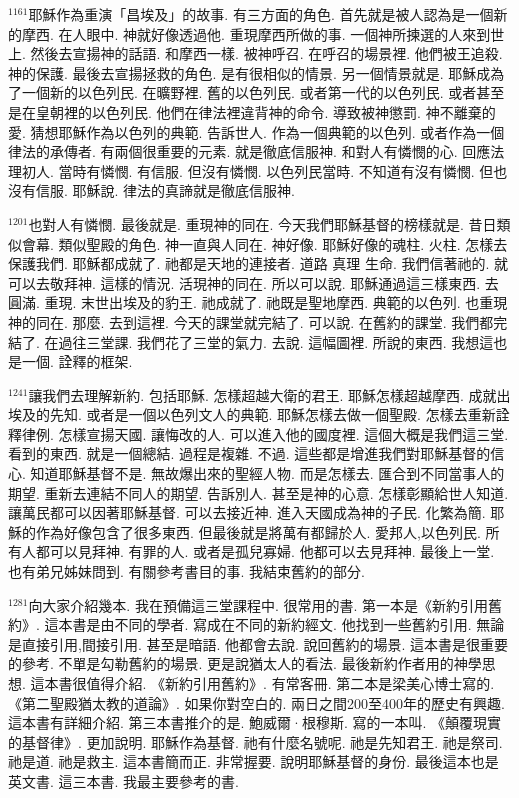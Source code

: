 \documentclass{book}
\begin{document}
$^{1161}$耶穌作為重演「昌埃及」的故事.
有三方面的角色.
首先就是被人認為是一個新的摩西.
在人眼中.
神就好像透過他.
重現摩西所做的事.
一個神所揀選的人來到世上.
然後去宣揚神的話語.
和摩西一樣.
被神呼召.
在呼召的場景裡.
他們被王追殺.
神的保護.
最後去宣揚拯救的角色.
是有很相似的情景.
另一個情景就是.
耶穌成為了一個新的以色列民.
在曠野裡.
舊的以色列民.
或者第一代的以色列民.
或者甚至是在皇朝裡的以色列民.
他們在律法裡違背神的命令.
導致被神懲罰.
神不離棄的愛.
猜想耶穌作為以色列的典範.
告訴世人.
作為一個典範的以色列.
或者作為一個律法的承傳者.
有兩個很重要的元素.
就是徹底信服神.
和對人有憐憫的心.
回應法理初人.
當時有憐憫.
有信服.
但沒有憐憫.
以色列民當時.
不知道有沒有憐憫.
但也沒有信服.
耶穌說.
律法的真諦就是徹底信服神.

$^{1201}$也對人有憐憫.
最後就是.
重現神的同在.
今天我們耶穌基督的榜樣就是.
昔日類似會幕.
類似聖殿的角色.
神一直與人同在.
神好像.
耶穌好像的魂柱.
火柱.
怎樣去保護我們.
耶穌都成就了.
祂都是天地的連接者.
道路 真理 生命.
我們信著祂的.
就可以去敬拜神.
這樣的情況.
活現神的同在.
所以可以說.
耶穌通過這三樣東西.
去圓滿.
重現.
末世出埃及的豹王.
祂成就了.
祂既是聖地摩西.
典範的以色列.
也重現神的同在.
那麼.
去到這裡.
今天的課堂就完結了.
可以說.
在舊約的課堂.
我們都完結了.
在過往三堂課.
我們花了三堂的氣力.
去說.
這幅圖裡.
所說的東西.
我想這也是一個.
詮釋的框架.

$^{1241}$讓我們去理解新約.
包括耶穌.
怎樣超越大衛的君王.
耶穌怎樣超越摩西.
成就出埃及的先知.
或者是一個以色列文人的典範.
耶穌怎樣去做一個聖殿.
怎樣去重新詮釋律例.
怎樣宣揚天國.
讓悔改的人.
可以進入他的國度裡.
這個大概是我們這三堂.
看到的東西.
就是一個總結.
過程是複雜.
不過.
這些都是增進我們對耶穌基督的信心.
知道耶穌基督不是.
無故爆出來的聖經人物.
而是怎樣去.
匯合到不同當事人的期望.
重新去連結不同人的期望.
告訴別人.
甚至是神的心意.
怎樣彰顯給世人知道.
讓萬民都可以因著耶穌基督.
可以去接近神.
進入天國成為神的子民.
化繁為簡.
耶穌的作為好像包含了很多東西.
但最後就是將萬有都歸於人.
愛邦人,以色列民.
所有人都可以見拜神.
有罪的人.
或者是孤兒寡婦.
他都可以去見拜神.
最後上一堂.
也有弟兄姊妹問到.
有關參考書目的事.
我結束舊約的部分.

$^{1281}$向大家介紹幾本.
我在預備這三堂課程中.
很常用的書.
第一本是《新約引用舊約》.
這本書是由不同的學者.
寫成在不同的新約經文.
他找到一些舊約引用.
無論是直接引用,間接引用.
甚至是暗語.
他都會去說.
說回舊約的場景.
這本書是很重要的參考.
不單是勾勒舊約的場景.
更是說猶太人的看法.
最後新約作者用的神學思想.
這本書很值得介紹.
《新約引用舊約》.
有常客冊.
第二本是梁美心博士寫的.
《第二聖殿猶太教的道論》.
如果你對空白的.
兩日之間200至400年的歷史有興趣.
這本書有詳細介紹.
第三本書推介的是.
鮑威爾·根穆斯.
寫的一本叫.
《顛覆現實的基督律》.
更加說明.
耶穌作為基督.
祂有什麼名號呢.
祂是先知君王.
祂是祭司.
祂是道.
祂是救主.
這本書簡而正.
非常握要.
說明耶穌基督的身份.
最後這本也是英文書.
這三本書.
我最主要參考的書.
\end{document}

